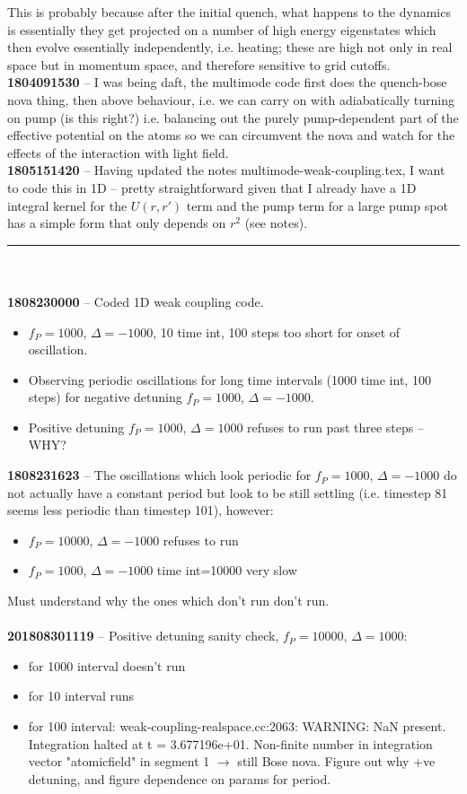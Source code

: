 \documentclass[a4paper,nobalancelastpage]{revtex4-1}
\newcommand{\mmtitle}[1]{\textcolor{multimode}{\textbf{#1}}}
\begin{document}
This is probably because after the initial quench, what happens to the dynamics is essentially they get projected on a number of high energy eigenstates which then evolve essentially independently, i.e. heating; these are high not only in real space but in momentum space, and therefore sensitive to grid cutoffs.\\

\mmtitle{1804091530} -- I was being daft, the multimode code first does the quench-bose nova thing, then above behaviour, i.e. we can carry on with adiabatically turning on pump (is this right?) i.e. balancing out the purely pump-dependent part of the effective potential on the atoms so we can circumvent the nova and watch for the effects of the interaction with light field.\\

\mmtitle{1805151420} -- Having updated the notes multimode-weak-coupling.tex, I want to code this in 1D -- pretty straightforward given that I already have a 1D integral kernel for the $U(r,r')$ term and the pump term for a large pump spot has a simple form that only depends on $r^2$ (see notes).

\noindent\rule{\textwidth}{0.5pt}\\
\\
\mmtitle{1808230000} -- Coded 1D weak coupling code.
\begin{itemize}
\item $f_P=1000$, $\Delta=-1000$, 10 time int, 100 steps too short for onset of oscillation.
\item Observing periodic oscillations for long time intervals (1000 time int, 100 steps) for negative detuning $f_P=1000$, $\Delta=-1000$.
\item Positive detuning $f_P=1000$, $\Delta=1000$ refuses to run past three steps -- WHY?
\end{itemize}

\mmtitle{1808231623} -- The oscillations which look periodic for $f_P=1000$, $\Delta=-1000$ do not actually have a constant period but look to be still settling (i.e. timestep 81 seems less periodic than timestep 101), however:
\begin{itemize}
\item $f_P=10000$, $\Delta=-1000$ refuses to run
\item $f_P=1000$, $\Delta=-1000$ time int=10000 very slow
\end{itemize}
Must understand why the ones which don't run don't run.\\
\\
\mmtitle{201808301119} -- Positive detuning sanity check, $f_P=10000$, $\Delta=1000$:
\begin{itemize}
\item for 1000 interval doesn't run
\item for 10 interval runs
\item for 100 interval: 
weak-coupling-realspace.cc:2063: WARNING: NaN present. Integration halted at t = 3.677196e+01.
Non-finite number in integration vector "atomicfield" in segment 1 $\rightarrow$ still Bose nova. Figure out why +ve detuning, and figure dependence on params for period.
\end{itemize}
\end{document}
